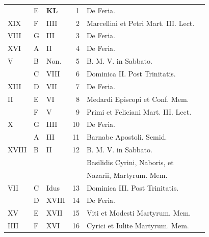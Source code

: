 \newpage
\color{Red}\color{black}

\begin{center}
\begin{tabular}{l | l | l | r | l l}
\color{Red}  & E & \textbf{\color{Red} K\color{Blue}L} & 1 & De Feria. & \color{Red} \\
\color{Red} XIX & F & \color{Red} IIII & 2 & Marcellini et Petri Mart. III. Lect. & \color{Red} \\
\color{Red} VIII & G & \color{Red} III & 3 & De Feria. & \color{Red} \\
\color{Red} XVI & \color{Red} A & \color{Red} II & 4 & De Feria. & \color{Red} \\
\color{Red} V & B & \color{Red} Non. & 5 & B. M. V. in Sabbato. & \color{Red} \\
\color{Red}  & C & \color{Red} VIII & 6 & Dominica II. Post Trinitatis. & \color{Red} \\
\color{Red} XIII & D & \color{Red} VII & 7 & De Feria. & \color{Red} \\
\color{Red} II & E & \color{Red} VI & 8 & Medardi Episcopi et Conf. Mem. & \color{Red} \\
\color{Red}  & F & \color{Red} V & 9 & Primi et Feliciani Mart. III. Lect. & \color{Red} \\
\color{Red} X & G & \color{Red} IIII & 10 & De Feria. & \color{Red} \\
\color{Red}  & \color{Red} A & \color{Red} III & 11 & \color{Red} Barnabe Apostoli. Semid. \\
\color{Red} XVIII & B & \color{Red} II & 12 & B. M. V. in Sabbato. \\
 &  &  &  & \quad \color{Red} Basilidis Cyrini, Naboris, et \\
 &  &  &  & \quad \color{Red} Nazarii, Martyrum. Mem. \\
\color{Red} VII & C & \color{Red} Idus & 13 & Dominica III. Post Trinitatis. & \color{Red} \\
\color{Red}  & D & \color{Red} XVIII & 14 & De Feria. \\
\color{Red} XV & E & \color{Red} XVII & 15 & \color{Red} Viti et Modesti Martyrum. Mem. \\
\color{Red} IIII & F & \color{Red} XVI & 16 & \color{Red} Cyrici et Iulite Martyrum. Mem. \\

\end{tabular}
\end{center}
